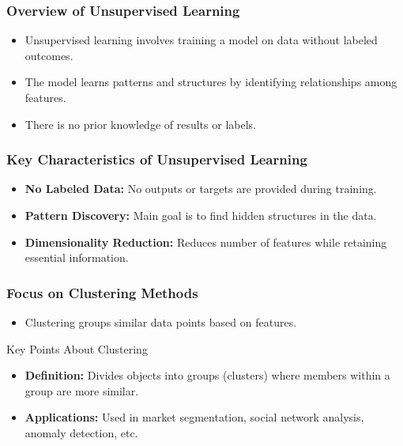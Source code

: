 \documentclass[aspectratio=169]{beamer}
\begin{document}
\frame{\titlepage}

\begin{frame}[fragile]
    \maketitle
\end{frame}

\begin{frame}[fragile]
    \frametitle{Overview of Unsupervised Learning}
    \begin{itemize}
        \item Unsupervised learning involves training a model on data without labeled outcomes.
        \item The model learns patterns and structures by identifying relationships among features.
        \item There is no prior knowledge of results or labels.
    \end{itemize}
\end{frame}

\begin{frame}[fragile]
    \frametitle{Key Characteristics of Unsupervised Learning}
    \begin{itemize}
        \item \textbf{No Labeled Data:} No outputs or targets are provided during training.
        \item \textbf{Pattern Discovery:} Main goal is to find hidden structures in the data.
        \item \textbf{Dimensionality Reduction:} Reduces number of features while retaining essential information.
    \end{itemize}
\end{frame}

\begin{frame}[fragile]
    \frametitle{Focus on Clustering Methods}
    \begin{itemize}
        \item Clustering groups similar data points based on features.
    \end{itemize}
    
    \begin{block}{Key Points About Clustering}
        \begin{itemize}
            \item \textbf{Definition:} Divides objects into groups (clusters) where members within a group are more similar.
            \item \textbf{Applications:} Used in market segmentation, social network analysis, anomaly detection, etc.
        \end{itemize}
    \end{block}
\end{frame}
\end{document}
